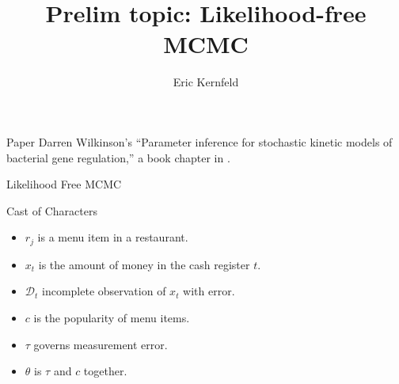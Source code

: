 \documentclass[12pt,a4paper,t,xcolor=dvipsnames,slidestop,compress,mathserif]{beamer}
\title[Likelihood-free MCMC]{Prelim topic: Likelihood-free MCMC}
\author[Eric Kernfeld]{ {Eric Kernfeld}\inst{1}}
\institute[University of Washington]
{ \inst{1}%
University of Washington Department of Statistics}
\date{}
\begin{document}
\maketitle



\begin{frame}{Paper}
Darren Wilkinson's ``Parameter inference for stochastic kinetic models of bacterial gene regulation,'' a book chapter in \cite{Bernardo2012}.

\end{frame}

\begin{frame}{Likelihood Free MCMC}

Cast of Characters 
\begin{itemize}
\item $r_j$ is a menu item in a restaurant.
\item $x_t$ is the amount of money in the cash register $t$. 
\item $\mathcal{D}_t$ incomplete observation of $x_t$ with error.
\item $c$ is the popularity of menu items.
\item $\tau$ governs measurement error.
\item $\theta$ is $\tau$ and $c$ together.
\end{itemize}

\end{frame}
\end{document}
